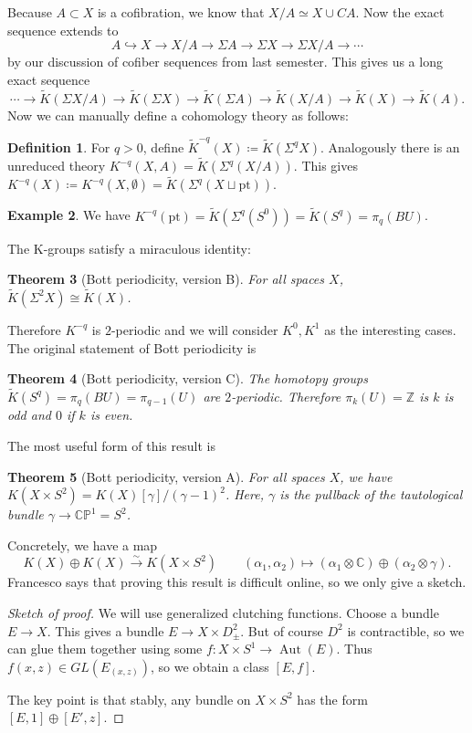 \documentclass[leqno, openany]{memoir}
\newtheorem{thm}{Theorem}[section]
\theoremstyle{definition}
\newtheorem{defn}[thm]{Definition}
\newtheorem{exm}[thm]{Example}
\theoremstyle{remark}
\theoremstyle{plain}
\theoremstyle{definition}
\theoremstyle{remark}
\newcommand{\C}{\mathbb{C}}
\newcommand{\Z}{\mathbb{Z}}
\renewcommand{\P}{\mathbb{P}}
\newcommand{\mr}[1]{\mathrm{#1}}
\newcommand{\wt}[1]{\widetilde{#1}}
\DeclareMathOperator{\Aut}{Aut}
\begin{document}
Because $A \subset X$ is a cofibration, we know that $X/A \simeq X \cup CA$. Now the exact sequence extends to
\[ A \hookrightarrow X \to X/A \to \Sigma A \to \Sigma X \to \Sigma X/A \to \cdots \]
by our discussion of cofiber sequences from last semester. This gives us a long exact sequence
\[ \cdots \to \wt{K}(\Sigma X/A) \to \wt{K}(\Sigma X) \to \wt{K}(\Sigma A) \to \wt{K}(X/A) \to \wt{K}(X) \to \wt{K}(A). \]
Now we can manually define a cohomology theory as follows:
\begin{defn}
    For $q > 0$, define $\wt{K}^{-q}(X) \coloneqq \wt{K}(\Sigma^q X)$. Analogously there is an unreduced theory $K^{-q}(X,A) = \wt{K}(\Sigma^q(X/A))$. This gives $K^{-q}(X) \coloneqq K^{-q}(X, \emptyset) = \wt{K}(\Sigma^q(X \sqcup \mr{pt}))$.
\end{defn}

\begin{exm}
    We have $K^{-q}(\mr{pt}) = \wt{K}(\Sigma^q(S^0)) = \wt{K}(S^q) = \pi_q(BU)$.
\end{exm}

The K-groups satisfy a miraculous identity:
\begin{thm}[Bott periodicity, version B]
For all spaces $X$, $\wt{K}(\Sigma^2 X) \cong \wt{K}(X)$.
\end{thm}
Therefore $K^{-q}$ is $2$-periodic and we will consider $K^0, K^1$ as the interesting cases. The original statement of Bott periodicity is

\begin{thm}[Bott periodicity, version C]
    The homotopy groups $\wt{K}(S^q) = \pi_q(BU) = \pi_{q-1}(U)$ are $2$-periodic. Therefore $\pi_k(U) = \Z$ is $k$ is odd and $0$ if $k$ is even.
\end{thm}

The most useful form of this result is
\begin{thm}[Bott periodicity, version A]
    For all spaces $X$, we have $K(X \times S^2) = K(X)[\gamma]/{(\gamma-1)}^2$. Here, $\gamma$ is the pullback of the tautological bundle $\gamma \to \C\P^1 = S^2$.
\end{thm}

Concretely, we have a map 
\[ K(X) \oplus K(X) \xrightarrow{\sim} K(X \times S^2) \qquad (\alpha_1, \alpha_2) \mapsto (\alpha_1 \otimes \C) \oplus (\alpha_2 \otimes \gamma). \]
Francesco says that proving this result is difficult online, so we only give a sketch.

\begin{proof}[Sketch of proof]
    We will use generalized clutching functions. Choose a bundle $E \to X$. This gives a bundle $E \to X \times D^2_{\pm}$. But of course $D^2$ is contractible, so we can glue them together using some $f \colon X \times S^1 \to \Aut(E)$. Thus $f(x,z) \in GL(E_{(x,z)})$, so we obtain a class $[E, f]$.

    The key point is that stably, any bundle on $X \times S^2$ has the form $[E,1] \oplus [E', z]$.
\end{proof}
\end{document}
